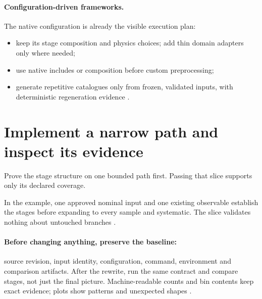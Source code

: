 \paragraph{Configuration-driven frameworks.} The native configuration is already the
visible execution plan:
\begin{itemize}
  \item keep its stage composition and physics choices; add thin domain adapters only where
        needed;
  \item use native includes or composition before custom preprocessing;
  \item generate repetitive catalogues only from frozen, validated inputs, with deterministic
        regeneration evidence \cite[Ownership and framework composition]{skill:implementation}.
\end{itemize}

\section{Implement a narrow path and inspect its evidence}

\begin{headline}
  Prove the stage structure on one bounded path first. Passing that slice supports only
  its declared coverage.
\end{headline}

In the example, one approved nominal input and one existing observable establish the
stages before expanding to every sample and systematic. The slice validates nothing about
untouched branches \cites[Establish the scientific contract]{skill:coding}[Validation
  order]{skill:implementation}.

\paragraph{Before changing anything, preserve the baseline:} source revision, input
identity, configuration, command, environment and comparison artifacts. After the
rewrite, run the same contract and compare stages, not just the final picture.
Machine-readable counts and bin contents keep exact evidence; plots show patterns and
unexpected shapes \cites[Performance]{skill:implementation}[Validation
  order]{skill:implementation}.

